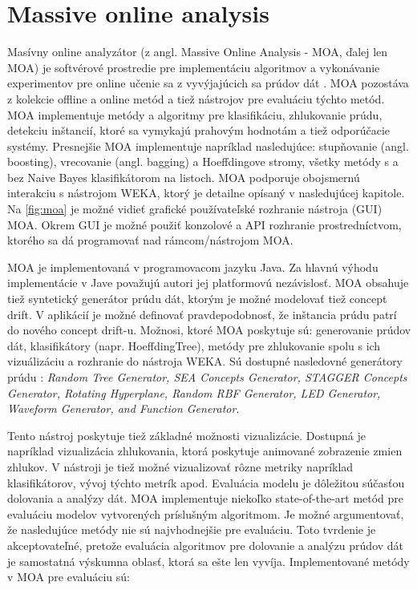 \section{Massive online analysis}
Masívny online analyzátor (z angl. Massive Online Analysis - MOA, ďalej len MOA) je softvérové prostredie pre implementáciu algoritmov a vykonávanie experimentov pre online učenie sa z vyvýjajúcich sa prúdov dát \citep{DBLP:journals/jmlr/BifetHKP10}. MOA pozostáva z kolekcie offline a online metód a tiež nástrojov pre evaluáciu týchto metód. MOA implementuje metódy a algoritmy pre klasifikáciu, zhlukovanie prúdu, detekciu inštancií, ktoré sa vymykajú prahovým hodnotám a tiež odporúčacie systémy. Presnejšie MOA implementuje napríklad nasledujúce: stupňovanie (angl. boosting), vrecovanie (angl. bagging) a Hoeffdingove stromy, všetky metódy s a bez Naive Bayes klasifikátorom na listoch. MOA podporuje obojsmernú interakciu s nástrojom WEKA, ktorý je detailne opísaný v nasledujúcej kapitole. Na \ref{fig:moa} je možné vidieť grafické používateľské rozhranie nástroja (GUI) MOA. Okrem GUI je možné použiť konzolové a API rozhranie prostredníctvom, ktorého sa dá programovať nad rámcom/nástrojom MOA.
\par
MOA je implementovaná v programovacom jazyku Java. Za hlavnú výhodu implementácie v Jave považujú autori jej platformovú nezávislosť. MOA obsahuje tiež syntetický generátor prúdu dát, ktorým je možné modelovať tiež concept drift. V aplikácií je možné definovať pravdepodobnosť, že inštancia prúdu patrí do nového concept drift-u. Možnosi, ktoré MOA poskytuje sú: generovanie prúdov dát, klasifikátory (napr. HoeffdingTree), metódy pre zhlukovanie spolu s ich vizuálizáciu a rozhranie do nástroja WEKA. Sú dostupné nasledovné generátory prúdu \citep{DBLP:journals/jmlr/BifetHKP10}: \textit{Random Tree Generator, SEA Concepts Generator, STAGGER Concepts Generator, Rotating Hyperplane, Random RBF Generator, LED Generator, Waveform Generator, and Function Generator}.
\par
Tento nástroj poskytuje tiež základné možnosti vizualizácie. Dostupná je napríklad vizualizácia zhlukovania, ktorá poskytuje animované zobrazenie zmien zhlukov. V nástroji je tiež možné vizualizovať rôzne metriky napríklad klasifikátorov, vývoj týchto metrík apod.
\label{fig:moa}
Evaluácia modelu je dôležitou súčasťou dolovania a analýzy dát. MOA implementuje niekoľko state-of-the-art metód pre evaluáciu modelov vytvorených príslušným algoritmom. Je možné argumentovať, že nasledujúce metódy nie sú najvhodnejšie pre evaluáciu. Toto tvrdenie je akceptovateľné, pretože evaluácia algoritmov pre dolovanie a analýzu prúdov dát je samostatná výskumna oblasť, ktorá sa ešte len vyvíja. Implementované metódy v MOA pre evaluáciu sú:
